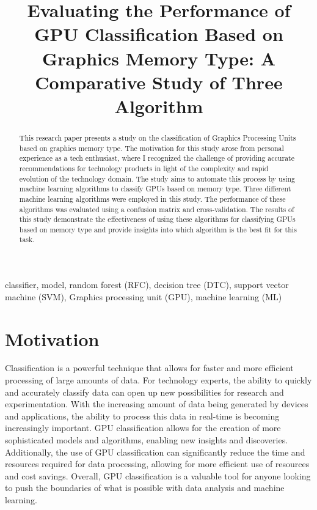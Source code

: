 \documentclass[conference]{IEEEtran}
\begin{document}
\title{Evaluating the Performance of GPU Classification Based on Graphics Memory Type: A Comparative Study of Three Algorithm}

\author{

}

\maketitle

\begin{abstract}
This research paper presents a study on the classification of Graphics Processing Units based on graphics memory type. The motivation for this study arose from personal experience as a tech enthusiast, where I recognized the challenge of providing accurate recommendations for technology products in light of the complexity and rapid evolution of the technology domain. The study aims to automate this process by using machine learning algorithms to classify GPUs based on memory type. Three different machine learning algorithms were employed in this study. The performance of these algorithms was evaluated using a confusion matrix and cross-validation. The results of this study demonstrate the effectiveness of using these algorithms for classifying GPUs based on memory type and provide insights into which algorithm is the best fit for this task.\\
\end{abstract}

\begin{IEEEkeywords}
classifier, model, random forest (RFC), decision tree (DTC), support vector machine (SVM), Graphics processing unit (GPU), machine learning (ML)
\end{IEEEkeywords}

\section{Motivation}
Classification is a powerful technique that allows for faster and more efficient processing of large amounts of data. For technology experts, the ability to quickly and accurately classify data can open up new possibilities for research and experimentation. With the increasing amount of data being generated by devices and applications, the ability to process this data in real-time is becoming increasingly important. GPU classification allows for the creation of more sophisticated models and algorithms, enabling new insights and discoveries. Additionally, the use of GPU classification can significantly reduce the time and resources required for data processing, allowing for more efficient use of resources and cost savings. Overall, GPU classification is a valuable tool for anyone looking to push the boundaries of what is possible with data analysis and machine learning.\\
\end{document}
